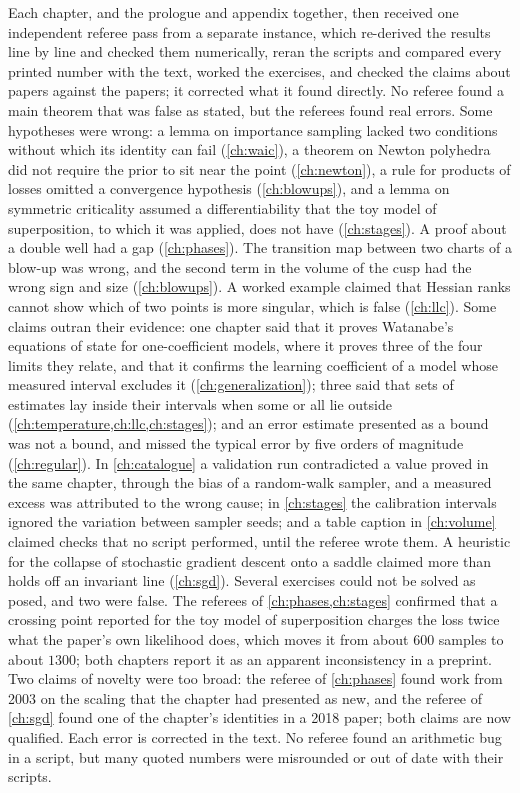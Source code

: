 Each chapter, and the prologue and appendix together, then received one independent referee pass from a separate instance, which re-derived the results line by line and checked them numerically, reran the scripts and compared every printed number with the text, worked the exercises, and checked the claims about papers against the papers; it corrected what it found directly. No referee found a main theorem that was false as stated, but the referees found real errors. Some hypotheses were wrong: a lemma on importance sampling lacked two conditions without which its identity can fail (\cref{ch:waic}), a theorem on Newton polyhedra did not require the prior to sit near the point (\cref{ch:newton}), a rule for products of losses omitted a convergence hypothesis (\cref{ch:blowups}), and a lemma on symmetric criticality assumed a differentiability that the toy model of superposition, to which it was applied, does not have (\cref{ch:stages}). A proof about a double well had a gap (\cref{ch:phases}). The transition map between two charts of a blow-up was wrong, and the second term in the volume of the cusp had the wrong sign and size (\cref{ch:blowups}). A worked example claimed that Hessian ranks cannot show which of two points is more singular, which is false (\cref{ch:llc}). Some claims outran their evidence: one chapter said that it proves Watanabe's equations of state for one-coefficient models, where it proves three of the four limits they relate, and that it confirms the learning coefficient of a model whose measured interval excludes it (\cref{ch:generalization}); three said that sets of estimates lay inside their intervals when some or all lie outside (\cref{ch:temperature,ch:llc,ch:stages}); and an error estimate presented as a bound was not a bound, and missed the typical error by five orders of magnitude (\cref{ch:regular}). In \cref{ch:catalogue} a validation run contradicted a value proved in the same chapter, through the bias of a random-walk sampler, and a measured excess was attributed to the wrong cause; in \cref{ch:stages} the calibration intervals ignored the variation between sampler seeds; and a table caption in \cref{ch:volume} claimed checks that no script performed, until the referee wrote them. A heuristic for the collapse of stochastic gradient descent onto a saddle claimed more than holds off an invariant line (\cref{ch:sgd}). Several exercises could not be solved as posed, and two were false. The referees of \cref{ch:phases,ch:stages} confirmed that a crossing point reported for the toy model of superposition charges the loss twice what the paper's own likelihood does, which moves it from about $600$ samples to about $1300$; both chapters report it as an apparent inconsistency in a preprint. Two claims of novelty were too broad: the referee of \cref{ch:phases} found work from 2003 on the scaling that the chapter had presented as new, and the referee of \cref{ch:sgd} found one of the chapter's identities in a 2018 paper; both claims are now qualified. Each error is corrected in the text. No referee found an arithmetic bug in a script, but many quoted numbers were misrounded or out of date with their scripts.

